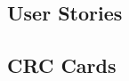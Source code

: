 \documentclass[a4paper]{article}
\begin{document}
	


	\newpage{}
    \begin{centering}
    \section*{User Stories}
    \vspace{18pt}
    \end{centering}
	

	\newpage{}
    \begin{centering}
    \section*{CRC Cards}
    \vspace{18pt}
    \end{centering}
	
\end{document}

